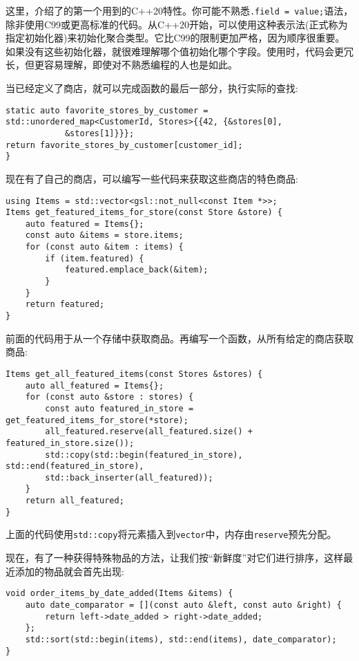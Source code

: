 这里，介绍了的第一个用到的C++20特性。你可能不熟悉\texttt{.field = value;}语法，除非使用C99或更高标准的代码。从C++20开始，可以使用这种表示法(正式称为指定初始化器)来初始化聚合类型。它比C99的限制更加严格，因为顺序很重要。如果没有这些初始化器，就很难理解哪个值初始化哪个字段。使用时，代码会更冗长，但更容易理解，即使对不熟悉编程的人也是如此。

当已经定义了商店，就可以完成函数的最后一部分，执行实际的查找:

\begin{lstlisting}[style=styleCXX]
static auto favorite_stores_by_customer =
std::unordered_map<CustomerId, Stores>{{42, {&stores[0],
			&stores[1]}}};
return favorite_stores_by_customer[customer_id];
}
\end{lstlisting}

现在有了自己的商店，可以编写一些代码来获取这些商店的特色商品:

\begin{lstlisting}[style=styleCXX]
using Items = std::vector<gsl::not_null<const Item *>>;
Items get_featured_items_for_store(const Store &store) {
	auto featured = Items{};
	const auto &items = store.items;
	for (const auto &item : items) {
		if (item.featured) {
			featured.emplace_back(&item);
		}
	}
	return featured;
}
\end{lstlisting}

前面的代码用于从一个存储中获取商品。再编写一个函数，从所有给定的商店获取商品:

\begin{lstlisting}[style=styleCXX]
Items get_all_featured_items(const Stores &stores) {
	auto all_featured = Items{};
	for (const auto &store : stores) {
		const auto featured_in_store = get_featured_items_for_store(*store);
		all_featured.reserve(all_featured.size() + featured_in_store.size());
		std::copy(std::begin(featured_in_store), std::end(featured_in_store),
		std::back_inserter(all_featured));
	}
	return all_featured;
}
\end{lstlisting}

上面的代码使用\texttt{std::copy}将元素插入到\texttt{vector}中，内存由\texttt{reserve}预先分配。

现在，有了一种获得特殊物品的方法，让我们按“新鲜度”对它们进行排序，这样最近添加的物品就会首先出现:

\begin{lstlisting}[style=styleCXX]
void order_items_by_date_added(Items &items) {
	auto date_comparator = [](const auto &left, const auto &right) {
		return left->date_added > right->date_added;
	};
	std::sort(std::begin(items), std::end(items), date_comparator);
}
\end{lstlisting}

